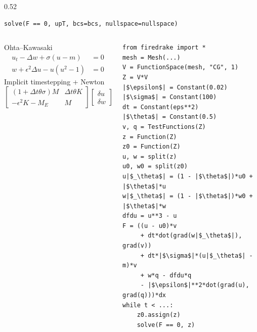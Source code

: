 \documentclass[presentation,aspectratio=43]{beamer}
\begin{document}
\begin{frame}[fragile,t]
\begin{columns}
\begin{column}{0.52\framewidth}
\begin{verbatim}
solve(F == 0, upT, bcs=bcs, nullspace=nullspace)
\end{verbatim}
    \end{column}
  \end{columns}
\end{frame}

\begin{frame}[fragile]
  \begin{columns}
    \begin{column}{0.5\textwidth}
      \begin{block}{Ohta--Kawasaki}
        \small
        \begin{align*}
          u_t - \Delta w + \sigma(u - m) &= 0\\
          w + \epsilon^2 \Delta u - u(u^2 - 1) &= 0
        \end{align*}
        Implicit timestepping + Newton
        \begin{equation*}
          \begin{bmatrix}
            (1 + \Delta t \theta \sigma)M  & \Delta t\theta K \\
            -\epsilon^2 K - M_E & M
          \end{bmatrix}
          \begin{bmatrix}
            \delta u \\
            \delta w
          \end{bmatrix} =
          \begin{bmatrix}
            f_1 \\
            f_2
          \end{bmatrix}
        \end{equation*}
      \end{block}
    \end{column}
    \begin{column}{0.5\textwidth}
\begin{verbatim}
from firedrake import *
mesh = Mesh(...)
V = FunctionSpace(mesh, "CG", 1)
Z = V*V
|$\epsilon$| = Constant(0.02)
|$\sigma$| = Constant(100)
dt = Constant(eps**2)
|$\theta$| = Constant(0.5)
v, q = TestFunctions(Z)
z = Function(Z)
z0 = Function(Z)
u, w = split(z)
u0, w0 = split(z0)
u|$_\theta$| = (1 - |$\theta$|)*u0 + |$\theta$|*u
w|$_\theta$| = (1 - |$\theta$|)*w0 + |$\theta$|*w
dfdu = u**3 - u
F = ((u - u0)*v
     + dt*dot(grad(w|$_\theta$|), grad(v))
     + dt*|$\sigma$|*(u|$_\theta$| - m)*v
     + w*q - dfdu*q
     - |$\epsilon$|**2*dot(grad(u), grad(q)))*dx
while t < ...:
    z0.assign(z)
    solve(F == 0, z)
\end{verbatim}
    \end{column}
  \end{columns}
\end{frame}
\end{document}
